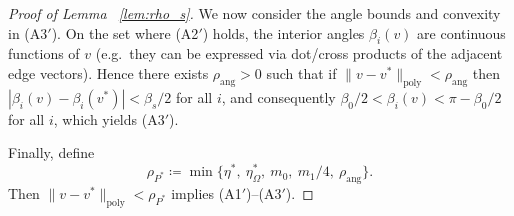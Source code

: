 \documentclass[10pt,a4paper]{amsart}
\begin{document}
\begin{proof}[Proof of Lemma ~\ref{lem:rho_s}]
We now consider the angle bounds and convexity in (A3$'$). On the set where \textup{(A2$'$)} holds, the interior angles $\beta_i(v)$ are continuous functions of $v$
(e.g.\ they can be expressed via dot/cross products of the adjacent edge vectors).
Hence there exists $\rho_{\mathrm{ang}}>0$ such that if $\|v-v^\ast\|_{\mathrm{poly}}<\rho_{\mathrm{ang}}$ then
$|\beta_i(v)-\beta_i(v^\ast)|<\beta_s/2$ for all $i$, and consequently
$\beta_0/2<\beta_i(v)<\pi-\beta_0/2$ for all $i$, which yields \textup{(A3$'$)}.

Finally, define
\[
\rho_{P^\ast}\coloneqq \min\Big\{\eta^\ast,\ \eta_\Omega^\ast,\ m_0,\ m_1/4,\ \rho_{\mathrm{ang}}\Big\}.
\]
Then $\|v-v^\ast\|_{\mathrm{poly}}<\rho_{P^\ast}$ implies \textup{(A1$'$)--(A3$'$)}.
\end{proof}
\end{document}
